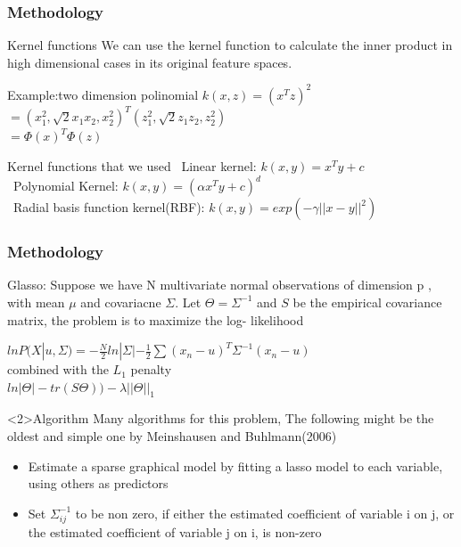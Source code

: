 \documentclass[xcolor={x11names,svgnames,dvipsnames}]{beamer}
\begin{document}
\begin{frame}
\frametitle{Methodology}
\begin{block}{Kernel functions}
We can use the kernel function to calculate the inner product in high dimensional cases in its original feature spaces.
\end{block}
\begin{block}{Example:two dimension polinomial}
$k(x,z)=(x^Tz)^2$\\
$=(x_1^2,\sqrt{2}x_1x_2,x_2^2)^T(z_1^2,\sqrt{2}z_1z_2,z_2^2)$\\
$=\Phi(x)^T\Phi(z)$\\
\end{block}
\begin{block}{Kernel functions that we used}
\small{
\textbullet\ {Linear kernel:  $k(x,y)=x^Ty+c$}\\
\textbullet\ {Polynomial Kernel:  $k(x,y)=(\alpha x^Ty+c)^d$}\\
\textbullet\ {Radial basis function kernel(RBF):  $k(x,y)=exp(-\gamma||x-y||^2)$}
}
\end{block}

\end{frame}


\begin{frame}
\frametitle{Methodology}
  \begin{block}{Glasso:}
    Suppose we have N multivariate normal observations of dimension p , with mean $\mu$ and covariacne $\Sigma$. Let $\Theta=\Sigma^{-1}$ and $S$ be the empirical covariance matrix, the problem is to maximize the log- likelihood \\
    \begin{center}
    $lnP(X|u,\Sigma)=-\frac{N}{2}ln|\Sigma|-\frac{1}{2}\sum(x_n-u)^T \Sigma^{-1}(x_n-u)$\\
    combined with the $L_1$ penalty\\
    $ln |\Theta|- tr(S\Theta))-\lambda||\Theta||_1$
  \end{center}
  \end{block}

  \begin{block}<2>{Algorithm}
  Many algorithms for this problem, The following might be the oldest and simple one by Meinshausen and Buhlmann(2006)
    \begin{itemize}
        \item  Estimate a sparse graphical model by fitting a lasso model to each variable, using others as predictors
        \item  Set $\Sigma_{ij}^{-1}$ to be non zero, if either the estimated coefficient of variable i on j, or the
        estimated coefficient of variable j on i, is non-zero
    \end{itemize}
  \end{block}
\end{frame}
\end{document}
